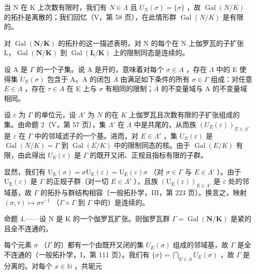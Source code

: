 当 N 在 K 上次数有限时，我们有 \(N \in \Lambda\) 且 \(U_{N}(\sigma) = \{\sigma\}\) ，故 \(\operatorname{Gal}(N/K)\) 的拓扑是离散的；我们回忆（V，第 58 页），在此情形群 \(\operatorname{Gal}(N/K)\) 是有限的。

对 \(\operatorname{Gal}(\mathbf{N}/\mathbf{K})\) 的拓扑的这一描述表明，对 N 的每个在 N 上伽罗瓦的子扩张 L，\(\operatorname{Gal}(\mathbf{N}/\mathbf{K})\) 到 \(\operatorname{Gal}(\mathbf{L}/\mathbf{K})\) 上的限制同态是连续的。

设 A 是 \(\Gamma\) 的一个子集。说 A 是开的，意味着对每个 \(\sigma\in A\) ，存在 \(\Lambda\) 中的 E 使得集 \(U_{E}(\sigma)\) 包含于 A。A 的闭包 \(\bar{A}\) 由满足如下条件的所有 \(\sigma\in\Gamma\) 组成：对任意 \(E\in\Lambda\) ，存在 \(\tau\in A\) 在 E 上与 \(\sigma\) 有相同的限制；\(\bar{A}\) 的不变量域与 A 的不变量域相同。

设 \(\varepsilon\) 为 \(\Gamma\) 的单位元，设 \(\Lambda'\) 为 \(N\) 的在 \(K\) 上伽罗瓦且次数有限的子扩张组成的集。由命题 2（V，第 57 页），集 \(\Lambda'\) 在 \(\Lambda\) 中是共尾的，从而族 \((U_E(\varepsilon))_{E \in \Lambda'}\) 是 \(\varepsilon\) 在 \(\Gamma\) 中的邻域滤子的一个基。进而，对 \(E \in \Lambda'\) ，集 \(U_E(\varepsilon)\) 是 \(\operatorname{Gal}(N/K) = \Gamma\) 到 \(\operatorname{Gal}(E/K)\) 中的限制同态的核。由于 \(\operatorname{Gal}(E/K)\) 有限，由此得出 \(U_E(\varepsilon)\) 是 \(\Gamma\) 的既开又闭、正规且指标有限的子群。

显然，我们有 \(\mathrm{U}_{\mathrm{E}}(\sigma)=\sigma\mathrm{U}_{\mathrm{E}}(\varepsilon)=\mathrm{U}_{\mathrm{E}}(\varepsilon)\sigma\) （对 \(\sigma\in\Gamma\) 与 \(E\in\Lambda'\) ）。由于 \(\mathrm{U}_{\mathrm{E}}(\varepsilon)\) 是 \(\Gamma\) 的正规子群（对一切 \(E\in\Lambda'\) ），且族 \((\mathrm{U}_{\mathrm{E}}(\varepsilon))_{E\in\Lambda'}\) 是 \(\varepsilon\) 处的邻域基，故 \(\Gamma\) 的拓扑与群结构相容（一般拓扑学，III，第 223 页）。换言之，映射 \((\sigma,\tau)\mapsto\sigma\tau^{-1}\) （\(\Gamma\times\Gamma\) 到 \(\Gamma\) 中的）是连续的。

命题 4.——设 N 是 K 的一个伽罗瓦扩张。则伽罗瓦群 \(\Gamma = \operatorname{Gal}(\mathbf{N}/\mathbf{K})\) 是紧的且全不连通的。

每个元素 \(\sigma\) （\(\Gamma\) 的）都有一个由既开又闭的集 \(U_{E}(\sigma)\) 组成的邻域基，故 \(\Gamma\) 是全不连通的（一般拓扑学，I，第 111 页）。我们有 \(\{\sigma\} = \bigcap_{E \in \Lambda} U_{E}(\sigma)\) ，故 \(\Gamma\) 是分离的。对每个 \(x \in \mathbb{N}\) ，共轭元

